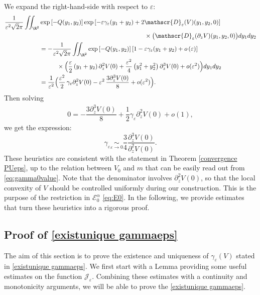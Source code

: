 \documentclass[10pt]{amsart}
\let\mathcal\mathscr
\theoremstyle{plain}
\theoremstyle{definition}
\newcommand{\D}{\mathcal{D}_\eps}
\newcommand{\Je}{\mathcal{J}_\eps}
\let\eps\varepsilon
\newcommand{\Eaz}{\mathcal{E}^\alpha_0}
\begin{document}
We expand the right-hand-side with respect to $\eps$:
\begin{align*}
\dfrac{1}{\eps^2\sqrt{2}\pi}\iint_{\R^2}& \exp \left[-Q(y_1,y_2) \right] \exp \left[ - \eps \gamma_\eps (y_1+y_2) + 2 \D(V)(y_1,y_2,0) \right]\\
& \hspace*{6cm}\times\bigl(\D(\partial_z V)(y_1,y_2,0) \bigr) d y_1 d y_2 \\
&=
- \dfrac{1}{\eps^2 \sqrt{2}\pi}\iint_{\R^2} \exp \left[-Q(y_1,y_2) \right] \left[1 - \eps \gamma_\eps (y_1+y_2) + o\left (\eps \right) \right]
\\
&\hspace*{1cm}\times \Bigl (\frac\eps2 \left (y_1 + y_2 \right) \partial_z^2 V(0) + \dfrac{\eps^2}4 \left (y_1^2 + y_2^2\right) \partial_z^3 V(0) + o(\eps^2) \Bigr) d y_1 d y_2
\\
& =\frac1{\eps^2} \Bigl(\dfrac{\eps^2}{2}\, \gamma_\eps \partial_z^2 V(0) - \eps^2\, \dfrac{3 \partial_z^3 V(0)}{8} + o(\eps^2) \Bigr).
\end{align*}
Then solving
\begin{align*}
0 = - \dfrac{3 \partial_z^3 V(0)}{8}+ \dfrac{1}{2} \gamma_\eps \partial_z^2 V(0) + o(1),
\end{align*}
we get the expression:
\begin{equation}\label{eq:gammaepsd=1}
\gamma_\eps \underset{\eps \to 0}{\sim} \dfrac{3}{4}\dfrac{\partial_z^3V(0)}{\partial_z^2 V(0)}.
\end{equation}
These heuristics are consistent with the statement in Theorem \ref{convergence PUeps}, up to the relation between $V_0$ and $m$ that can be easily read out from \eqref{eq:gamma0value}. Note that the denominator involves $\partial_z^2 V(0)$, so that the local convexity of $V$ should be controlled uniformly during our construction. This is the purpose of the restriction in $\Eaz$ \eqref{eq:E0}. In the following, we provide estimates that turn these heuristics into a rigorous proof.

\subsection{Proof of \cref{existunique gammaeps}}\label{sec:proof of prop24}
The aim of this section is to prove the existence and uniqueness of $\gamma_\eps(V)$ stated in \cref{existunique gammaeps}. We first start with a Lemma providing some useful estimates on the function $\Je$. Combining these estimates with a continuity and monotonicity arguments, we will be able to prove the \cref{existunique gammaeps}.
\end{document}
